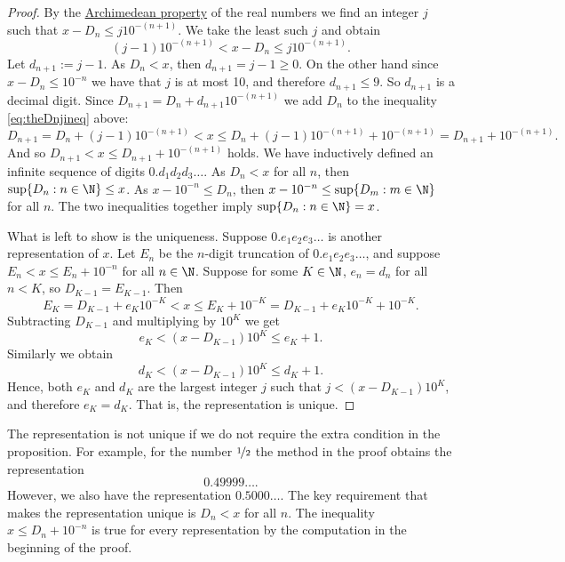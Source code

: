 \documentclass[12pt]{book}
\begin{document}
\begin{proof}
By the 
\hyperref[thm:arch:i]{Archimedean property} of the real numbers
we find an integer $j$ such that
$x-D_n \leq j {10}^{-(n+1)}$.
We take the least such $j$ and obtain 
\begin{equation} \label{eq:theDnjineq}
(j-1){10}^{-(n+1)} < x-D_n \leq j {10}^{-(n+1)} .
\end{equation}
Let $d_{n+1} := j-1$.
As $D_n < x$,
then $d_{n+1} = j-1 \geq 0$.
On the other hand since
$x-D_n \leq {10}^{-n}$ we have that
$j$ is at most 10, and therefore $d_{n+1} \leq 9$.
So $d_{n+1}$ is a
decimal digit.
Since $D_{n+1} = D_n + d_{n+1} {10}^{-(n+1)}$
we add $D_n$ to the inequality
\eqref{eq:theDnjineq} above:
\begin{equation*}
D_{n+1} = D_n + (j-1){10}^{-(n+1)} < x \leq
D_n + (j-1) {10}^{-(n+1)} +
{10}^{-(n+1)} = D_{n+1} + {10}^{-(n+1)} .
\end{equation*}
And so
$D_{n+1} < x \leq D_{n+1} + {10}^{-(n+1)}$ holds.
We have inductively
defined an infinite sequence of digits $0.d_1d_2d_3\ldots$.
As $D_n < x$ for all $n$, then
$\sup \{ D_n : n \in \N \} \leq x$.
As $x-{10}^{-n} \leq D_n$, then
$x-{10}^{-n} \leq \sup \{ D_m : m \in \N \}$ for all $n$.  
The two inequalities together imply
$\sup \{ D_n : n \in \N \} = x$.

What is left to show is the uniqueness.
Suppose $0.e_1e_2e_3\ldots$ is another representation of $x$.
Let $E_n$ be the $n$-digit truncation of $0.e_1e_2e_3\ldots$, and suppose
$E_n < x \leq E_n + {10}^{-n}$ for all $n \in \N$.
Suppose for some $K \in \N$, $e_n = d_n$ for all $n < K$, so
$D_{K-1} = E_{K-1}$.
Then
\begin{equation*}
E_K = D_{K-1} + e_K{10}^{-K} < x \leq E_K + {10}^{-K} = D_{K-1} +
e_K{10}^{-K} + {10}^{-K} .
\end{equation*}
Subtracting $D_{K-1}$ and multiplying by ${10}^{K}$ we get
\begin{equation*}
e_K < (x - D_{K-1}){10}^K \leq e_K + 1 .
\end{equation*}
Similarly we obtain
\begin{equation*}
d_K < (x - D_{K-1}){10}^K \leq d_K + 1 .
\end{equation*}
Hence, both $e_K$ and $d_K$ are the largest integer $j$
such that $j < (x - D_{K-1}){10}^K$, and therefore $e_K = d_K$.
That is,
the representation is unique.
\end{proof}

The representation is not unique if we do not require
the extra condition in the proposition.
For example, for the
number $\nicefrac{1}{2}$ the method in the proof obtains the representation
\begin{equation*}
0.49999\ldots .
\end{equation*}
However, we also have the representation $0.5000\ldots$.
The key requirement that makes the representation unique is
$D_n < x$ for all $n$.
The inequality
$x \leq D_n + {10}^{-n}$ is true for every representation
by the computation in the beginning of the proof.
\end{document}
